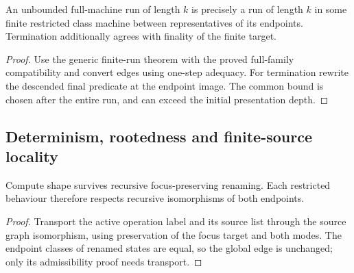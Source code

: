 

\begin{lemma}
An unbounded full-machine run of length $k$ is precisely a run of length $k$ in some finite restricted class machine between representatives of its endpoints. Termination additionally agrees with finality of the finite target.
\end{lemma}

\begin{proof}
Use the generic finite-run theorem with the proved full-family compatibility and convert edges using one-step adequacy. For termination rewrite the descended final predicate at the endpoint image. The common bound is chosen after the entire run, and can exceed the initial presentation depth.
\end{proof}



\subsection{Determinism, rootedness and finite-source locality}


\begin{lemma}
Compute shape survives recursive focus-preserving renaming. Each restricted behaviour therefore respects recursive isomorphisms of both endpoints.
\end{lemma}

\begin{proof}
Transport the active operation label and its source list through the source graph isomorphism, using preservation of the focus target and both modes. The endpoint classes of renamed states are equal, so the global edge is unchanged; only its admissibility proof needs transport.
\end{proof}





